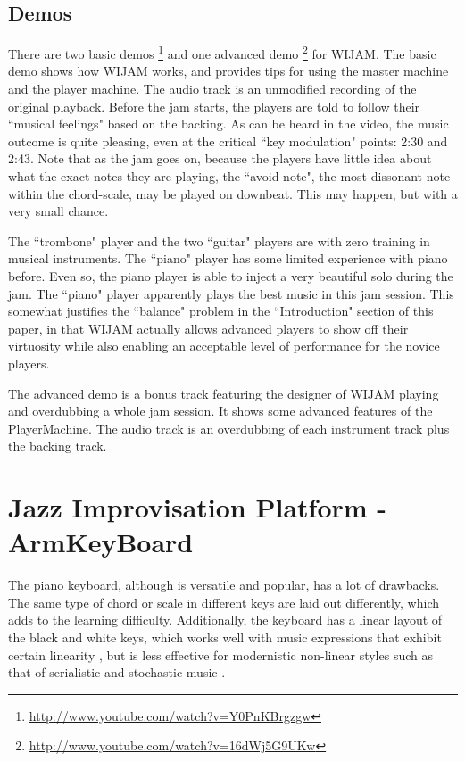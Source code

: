 \subsection{Demos}
There are two basic demos \footnote{\url{http://www.youtube.com/watch?v=Y0PnKBrgzgw}} and one advanced demo \footnote{\url{http://www.youtube.com/watch?v=16dWj5G9UKw}} for WIJAM. The basic demo shows how WIJAM works, and provides tips for using the master machine and the player machine. The audio track is an unmodified recording of the original playback. Before the jam starts, the players are told to follow their ``musical feelings" based on the backing. As can be heard in the video, the music outcome is quite pleasing, even at the critical ``key modulation" points: 2:30 and 2:43. Note that as the jam goes on, because the players have little idea about what the exact notes they are playing, the ``avoid note", the most dissonant note within the chord-scale, may be played on downbeat. This may happen, but with a very small chance.

The ``trombone" player and the two ``guitar" players are with zero training in musical instruments. The ``piano" player has some limited
experience with piano before. Even so, the piano player is able to inject a very beautiful solo during the jam. The ``piano" player apparently plays the best music in this jam session. This somewhat justifies the ``balance" problem in the ``Introduction" section of this paper, in that WIJAM actually allows advanced players to show off their virtuosity while also enabling an acceptable level of performance for the novice players.

The advanced demo is a bonus track featuring the designer of WIJAM playing and overdubbing a whole jam session. It shows some advanced features of the PlayerMachine. The audio track is an overdubbing of each instrument track plus the backing track.

\section{Jazz Improvisation Platform - ArmKeyBoard} \label{sec:5-akb}
The piano keyboard, although is versatile and popular, has a lot of drawbacks. The same type of chord or scale in different keys are laid out differently, which adds to the learning difficulty. Additionally, the keyboard has a linear layout of the black and white keys, which works well with music expressions that exhibit certain linearity , but is less effective for modernistic non-linear styles such as that of serialistic and stochastic music \cite{Mitsuko:Schoenberg}.

